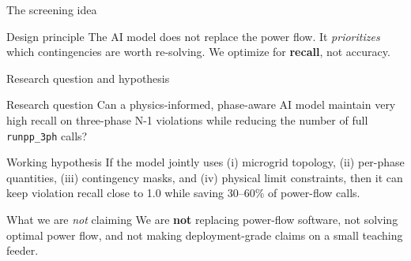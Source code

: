 \documentclass[aspectratio=169,10pt]{beamer}
\newcommand{\code}[1]{\texttt{#1}}
\begin{document}
\begin{frame}{The screening idea}
\centering
{}
\vspace{0.8em}
\begin{block}{Design principle}
The AI model does not replace the power flow. It \emph{prioritizes} which contingencies are worth re-solving. We optimize for \textbf{recall}, not accuracy.
\end{block}
\end{frame}

\begin{frame}{Research question and hypothesis}
\begin{block}{Research question}
Can a physics-informed, phase-aware AI model maintain very high recall on three-phase N-1 violations while reducing the number of full \code{runpp\_3ph} calls?
\end{block}
\vspace{0.4em}
\begin{block}{Working hypothesis}
If the model jointly uses (i) microgrid topology, (ii) per-phase quantities, (iii) contingency masks, and (iv) physical limit constraints, then it can keep violation recall close to 1.0 while saving 30--60\% of power-flow calls.
\end{block}
\vspace{0.4em}
\begin{alertblock}{What we are \emph{not} claiming}
We are \textbf{not} replacing power-flow software, not solving optimal power flow, and not making deployment-grade claims on a small teaching feeder.
\end{alertblock}
\end{frame}
\end{document}
